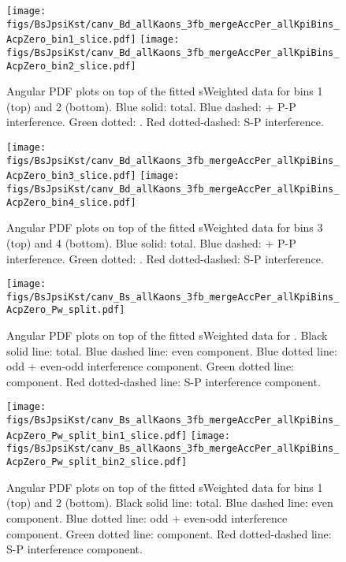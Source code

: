 \begin{figure}[h]
     \caption{\small Angular PDF plots on top of the fitted sWeighted data for \BdJpsiKst \mkpi bins 1 (top) and 2 (bottom). Blue solid: total. Blue dashed: \pwave + P-P interference. Green dotted: \swave. Red dotted-dashed: S-P interference.  } 
     \texttt{[image: figs/BsJpsiKst/canv\_Bd\_allKaons\_3fb\_mergeAccPer\_allKpiBins\_AcpZero\_bin1\_slice.pdf]}     
     \texttt{[image: figs/BsJpsiKst/canv\_Bd\_allKaons\_3fb\_mergeAccPer\_allKpiBins\_AcpZero\_bin2\_slice.pdf]}     
     \label{fig:angular_plots_Bd_bin1_bin2}
\end{figure}

\begin{figure}[h]
     \caption{\small Angular PDF plots on top of the fitted sWeighted data for \BdJpsiKst \mkpi bins 3 (top) and 4 (bottom). Blue solid: total. Blue dashed: \pwave + P-P interference. Green dotted: \swave. Red dotted-dashed: S-P interference.  }
     \texttt{[image: figs/BsJpsiKst/canv\_Bd\_allKaons\_3fb\_mergeAccPer\_allKpiBins\_AcpZero\_bin3\_slice.pdf]}     
     \texttt{[image: figs/BsJpsiKst/canv\_Bd\_allKaons\_3fb\_mergeAccPer\_allKpiBins\_AcpZero\_bin4\_slice.pdf]}     
     \label{fig:angular_plots_Bd_bin3_bin4}
\end{figure}
\begin{figure}[h]
     \caption{\small Angular PDF plots on top of the fitted sWeighted data for \BsJpsiKst. Black solid line: total. Blue dashed line: \pwave even component. Blue dotted line: \pwave odd + even-odd interference component. Green dotted line: \swave component. Red dotted-dashed line: S-P interference component.}
     \texttt{[image: figs/BsJpsiKst/canv\_Bs\_allKaons\_3fb\_mergeAccPer\_allKpiBins\_AcpZero\_Pw\_split.pdf]}
\end{figure}
%
\begin{figure}[h]
     \caption{\small Angular PDF plots on top of the fitted sWeighted data for \BsJpsiKst \mkpi bins 1 (top) and 2 (bottom). Black solid line: total. Blue dashed line: \pwave even component. Blue dotted line: \pwave odd + even-odd interference component. Green dotted line: \swave component. Red dotted-dashed line: S-P interference component.}
     \texttt{[image: figs/BsJpsiKst/canv\_Bs\_allKaons\_3fb\_mergeAccPer\_allKpiBins\_AcpZero\_Pw\_split\_bin1\_slice.pdf]}     
     \texttt{[image: figs/BsJpsiKst/canv\_Bs\_allKaons\_3fb\_mergeAccPer\_allKpiBins\_AcpZero\_Pw\_split\_bin2\_slice.pdf]}     
     \label{fig:angular_plots_Bs_bin1_bin2}
\end{figure}
